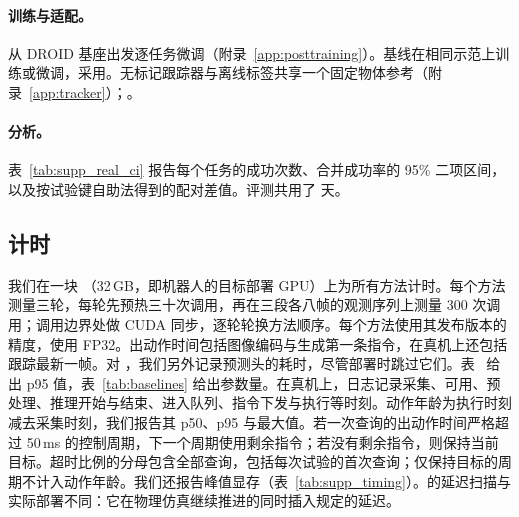\paragraph{训练与适配。}\ours 从 DROID 基座出发逐任务微调（附录~\ref{app:posttraining}）。基线在相同示范上训练或微调，采用。无标记跟踪器与离线标签共享一个固定物体参考（附录~\ref{app:tracker}）；。

\paragraph{分析。}表~\ref{tab:supp_real_ci} 报告每个任务的成功次数、合并成功率的 95\% 二项区间，以及按试验键自助法得到的配对差值。评测共用了  天。



\subsection{计时}
\label{app:timing}
我们在一块 \cfgGPU{}（32\,GB，即机器人的目标部署 GPU）上为所有方法计时。每个方法测量三轮，每轮先预热三十次调用，再在三段各八帧的观测序列上测量 300 次调用；调用边界处做 CUDA 同步，逐轮轮换方法顺序。每个方法使用其发布版本的精度，\ours 使用 FP32。出动作时间包括图像编码与生成第一条指令，在真机上还包括跟踪最新一帧。对 \ours，我们另外记录预测头的耗时，尽管部署时跳过它们。表~ 给出 p95 值，表~\ref{tab:baselines} 给出参数量。在真机上，日志记录采集、可用、预处理、推理开始与结束、进入队列、指令下发与执行等时刻。动作年龄为执行时刻减去采集时刻，我们报告其 p50、p95 与最大值。若一次查询的出动作时间严格超过 50\,ms 的控制周期，下一个周期使用剩余指令；若没有剩余指令，则保持当前目标。超时比例的分母包含全部查询，包括每次试验的首次查询；仅保持目标的周期不计入动作年龄。我们还报告峰值显存（表~\ref{tab:supp_timing}）。\bench 的延迟扫描与实际部署不同：它在物理仿真继续推进的同时插入规定的延迟。



